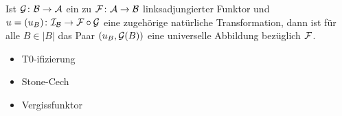 \begin{thm}
  Ist $\mathcal{G} \colon \mathcal{B} \to \mathcal{A}$ ein zu $\mathcal{F} \colon \mathcal{A} \to \mathcal{B}$ linksadjungierter Funktor und $u = (u_B) \colon \mathcal{I}_{\mathcal{B}} \to \mathcal{F} \circ \mathcal{G}$ eine zugehörige natürliche Transformation, dann ist für alle $B \in |B|$ das Paar $(u_B, \mathcal{G}(B))$ eine universelle Abbildung bezüglich $\mathcal{F}$.
\end{thm}

\begin{bem}
    
\end{bem}

\begin{ex}
  \begin{itemize}
    \item T0-ifizierung
    \item Stone-Cech
    \item Vergissfunktor
  \end{itemize}
\end{ex}


